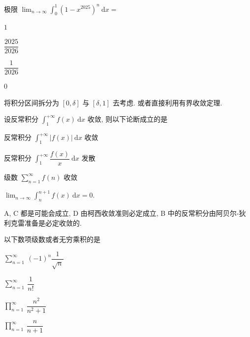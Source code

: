\begin{question}
极限 $\displaystyle \lim_{n\to\infty} \int_0^1 \left( 1 - x^{2025} \right)^n ~ \mathrm{d}x =$ \paren[D]

\begin{choices}
\item $1$
\item $\dfrac{2025}{2026}$
\item $\dfrac{1}{2026}$
\item $0$
\end{choices}
\end{question}

\begin{solution}
将积分区间拆分为 $[0, \delta]$ 与 $[\delta, 1]$ 去考虑. 或者直接利用有界收敛定理.
\end{solution}

\begin{question}
设反常积分 $\displaystyle \int_1^{+\infty} f(x) ~ \mathrm{d}x$ 收敛, 则以下论断成立的是 \paren[B]

\begin{choices}
\item 反常积分 $\displaystyle \int_1^{+\infty} | f(x) | ~ \mathrm{d}x$ 收敛
\item 反常积分 $\displaystyle \int_1^{+\infty} \dfrac{f(x)}{x} ~ \mathrm{d}x$ 发散
\item 级数 $\displaystyle \sum_{n=1}^{\infty} f(n)$ 收敛
\item $\displaystyle \lim_{n\to\infty} \int_n^{n+1} f(x) ~ \mathrm{d}x = 0.$
\end{choices}
\end{question}

\begin{solution}
A, C 都是可能会成立, D 由柯西收敛准则必定成立, B 中的反常积分由阿贝尔-狄利克雷准备是必定收敛的.
\end{solution}

\begin{question}
以下数项级数或者无穷乘积的是 \paren[D]

\begin{choices}
\item $\displaystyle \sum_{n=1}^{\infty} ~ (-1)^n \dfrac{1}{\sqrt{n}}$
\item $\displaystyle \sum_{n=1}^{\infty} ~ \dfrac{1}{n!}$
\item $\prod_{n=1}^{\infty} ~ \dfrac{n^2}{n^2+1}$
\item $\displaystyle \prod_{n=1}^{\infty} ~ \dfrac{n}{n+1}$
\end{choices}
\end{question}

